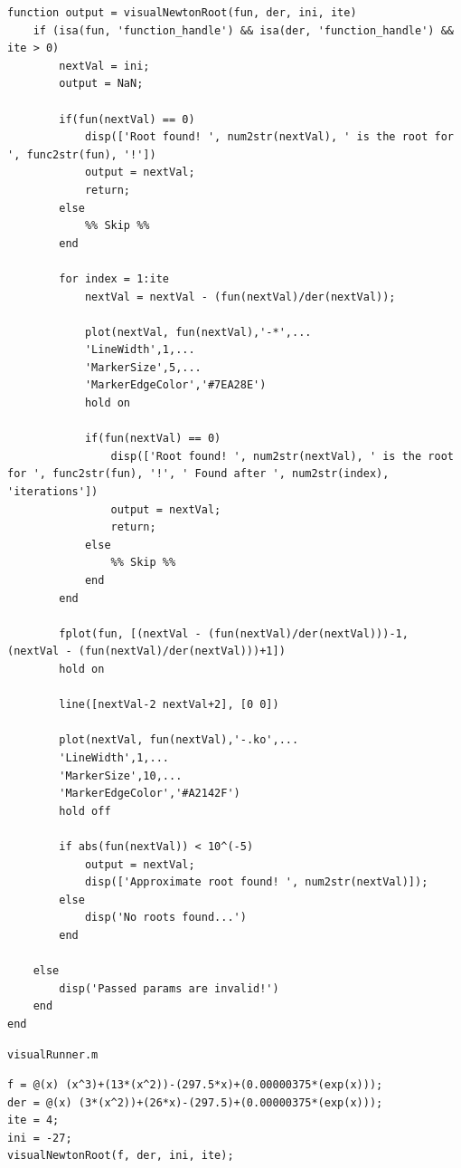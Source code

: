 \documentclass[english,notitlepage,letterpaper, 10pt]{article} %
\begin{document}
\begin{lstlisting}
function output = visualNewtonRoot(fun, der, ini, ite)
    if (isa(fun, 'function_handle') && isa(der, 'function_handle') && ite > 0)
        nextVal = ini;
        output = NaN;

        if(fun(nextVal) == 0) 
            disp(['Root found! ', num2str(nextVal), ' is the root for ', func2str(fun), '!'])
            output = nextVal;    
            return;
        else
            %% Skip %%
        end
        
        for index = 1:ite
            nextVal = nextVal - (fun(nextVal)/der(nextVal));

            plot(nextVal, fun(nextVal),'-*',...
            'LineWidth',1,...
            'MarkerSize',5,...
            'MarkerEdgeColor','#7EA28E')
            hold on

            if(fun(nextVal) == 0) 
                disp(['Root found! ', num2str(nextVal), ' is the root for ', func2str(fun), '!', ' Found after ', num2str(index), 'iterations'])
                output = nextVal;
                return;
            else
                %% Skip %%
            end
        end

        fplot(fun, [(nextVal - (fun(nextVal)/der(nextVal)))-1, (nextVal - (fun(nextVal)/der(nextVal)))+1])
        hold on

        line([nextVal-2 nextVal+2], [0 0])

        plot(nextVal, fun(nextVal),'-.ko',...
        'LineWidth',1,...
        'MarkerSize',10,...
        'MarkerEdgeColor','#A2142F')
        hold off

        if abs(fun(nextVal)) < 10^(-5)
            output = nextVal;
            disp(['Approximate root found! ', num2str(nextVal)]);
        else
            disp('No roots found...')
        end

    else
        disp('Passed params are invalid!')
    end
end     
\end{lstlisting}
\texttt{visualRunner.m}
\begin{lstlisting}
f = @(x) (x^3)+(13*(x^2))-(297.5*x)+(0.00000375*(exp(x)));
der = @(x) (3*(x^2))+(26*x)-(297.5)+(0.00000375*(exp(x)));
ite = 4;
ini = -27;
visualNewtonRoot(f, der, ini, ite);
\end{lstlisting}
\end{document}
